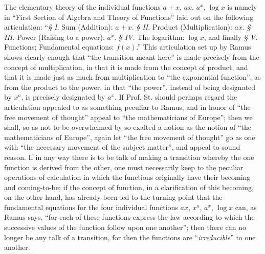 \documentclass[12pt,a4paper,openany]{book}
\newcommand{\opage}[1]{\marginnote{\footnotesize\textit{[#1]}}}
\begin{document}
The elementary theory of the individual functions $a + x$,
$a x$, $a^{x}$, $\log x$ is namely in ``First Section of Algebra and
Theory of Functions'' laid out on the following articulation: ``\textit{§ I.} Sum
(Addition): $a + x$. \textit{§ II.} Product (Multiplication): $a x$.
\textit{§ III.} Power (Raising to a power): $a^{x}$. \textit{§ IV.} The logarithm:
$\log x$, and finally \textit{§ V.} Functions; Fundamental equations: $f(x)$.'' This articulation set up by Ramus shows
clearly enough that ``the transition meant here'' is made precisely from
the concept of multiplication, in that it is made from the concept of product, and that it is made just as much from multiplication to
``the exponential function'', as from the product to the power, in that ``the power'', instead of being designated by $x^{a}$, is precisely
designated by $a^{x}$. If Prof. St. should perhaps regard the
articulation appealed to as something peculiar to Ramus, and in honor of ``the free movement of thought'' appeal to
``the mathematicians of Europe''; then we shall, so as not to be overwhelmed
 by so exalted a notion as the notion of
``the mathematicians of Europe'', again let ``the free movement of thought''
go as one with ``the necessary movement of the subject matter'', and appeal
to sound reason. If in any way there is to be talk
of making a transition whereby the one function is derived
from the other, one must necessarily keep to the peculiar operations of calculation in which the functions originally have
their becoming and coming-to-be; if the concept of function, in a
clarification of this becoming, on the other hand, has already been led to
\opage{21}\setcounter{footnote}{0}%
the turning point that the fundamental equations for the four individual
functions $a x$, $x^{a}$, $a^{x}$, $\log x$ can, as Ramus says,
``for each of these functions express the law according to which
the successive values of the function follow upon one another''; then
there can no longer be any talk of a transition, for then
the functions are ``\textit{irreducible}'' to one another.
\end{document}

